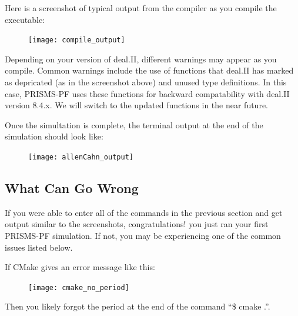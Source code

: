 \documentclass[10pt]{article} %
\begin{document}
Here is a screenshot of typical output from the compiler as you compile the executable:
\begin{figure}[H]
\vspace{0pt}
\hspace{-2cm}
\texttt{[image: compile\_output]}
\vspace{0pt}
\end{figure}
Depending on your version of deal.II, different warnings may appear as you compile. Common warnings include the use of functions that deal.II has marked as depricated (as in the screenshot above) and unused type definitions. In this case, PRISMS-PF uses these functions for backward compatability with deal.II version 8.4.x. We will switch to the updated functions in the near future.

Once the simultation is complete, the terminal output at the end of the simulation should look like:
\begin{figure}[H]
\vspace{-60pt}
\centering
\texttt{[image: allenCahn\_output]}
\vspace{-60pt}
\end{figure}

\subsection{What Can Go Wrong}
If you were able to enter all of the commands in the previous section and get output similar to the screenshots, congratulations! you just ran your first PRISMS-PF simulation. If not, you may be experiencing one of the common issues listed below.

If CMake gives an error message like this:
\begin{figure}[H]
\vspace{-90pt}
\centering
\texttt{[image: cmake\_no\_period]}
\vspace{-90pt}
\end{figure}
Then you likely forgot the period at the end of the command ``\$ cmake .''.
\end{document}
